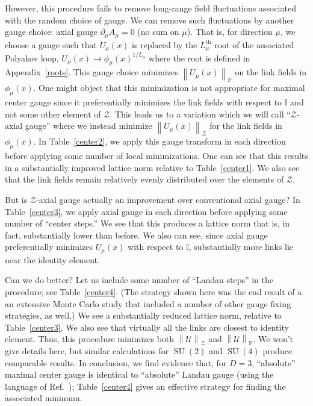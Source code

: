 \documentclass[preprint,aps,prd]{revtex4-2}
\newcommand{\zentrum}{\mathcal{Z}}       %
\newcommand{\config}{\mathcal{U}}
\DeclareMathOperator{\SU}{SU}
\newcommand\fnorm[1]{\left\lVert #1 \right\rVert_\mathrm{F}}
\newcommand\znorm[1]{\left\lVert #1 \right\rVert_\zentrum}
\begin{document}
However, this procedure fails to remove long-range field fluctuations
associated with the random choice of gauge.  We can remove
such fluctuations by another gauge choice:  axial gauge
$\partial_\mu A_\mu = 0$ (no sum on $\mu$).
That is, for direction $\mu$, we choose a gauge such that $U_\mu(x)$
is replaced by the $L_\mu^\mathrm{th}$ root of the associated Polyakov loop,
$U_\mu(x) \to \phi_\mu(x)^{1/L_\mu}$ where the root is defined in
Appendix~\ref{roots}.
This gauge choice minimizes $\fnorm{U_\mu(x)}$
on the link fields in $\phi_\mu(x)$.  One might
object that this minimization is not appropriate for maximal center gauge
since it preferentially minimizes the link fields
with respect to $\mathbb{I}$ and not some other element of $\zentrum$.
This leads us to a variation which we will call ``$\zentrum$-axial gauge''
where we instead minimize $\znorm{U_\mu(x)}$
for the link fields in $\phi_\mu(x)$.  In Table~\ref{center2},
we apply this gauge transform in each direction before applying
some number of local minimizations.  One can see that this
results in a substantially improved lattice norm relative to
Table~\ref{center1}.  We also see that the link fields
remain relatively evenly distributed over the elements of $\zentrum$.

But is $\zentrum$-axial gauge actually an improvement over
conventional axial gauge?
In Table~\ref{center3}, we apply axial gauge in each
direction before applying some number of ``center steps.''
We see that this produces a lattice norm that is, in fact,
substantially lower than before.  We also can see, since
axial gauge preferentially minimizes $U_\mu(x)$ with
respect to $\mathbb{I}$, substantially more links lie near
the identity element.

Can we do better? Let us include some number of ``Landau steps''
in the procedure; see Table~\ref{center4}.  (The strategy shown
here was the end result of a an extensive Monte Carlo study that
included a number of other gauge fixing strategies, as well.)
We see a substantially reduced lattice norm, relative to
Table~\ref{center3}.  We also see that virtually all the
links are closest to identity element.  Thus, this procedure
minimizes both $\znorm{\config}$ and $\fnorm{\config}$.
We won't give details here, but similar calculations for
$\SU(2)$ and $\SU(4)$ produce comparable results.
In conclusion, we find evidence that, for $D=3$,
``absolute'' maximal center gauge is identical to ``absolute''
Landau gauge (using the language of Ref.~\cite{maas_more_2009});
Table~\ref{center4} gives
an effective strategy for finding the associated minimum.
\end{document}
